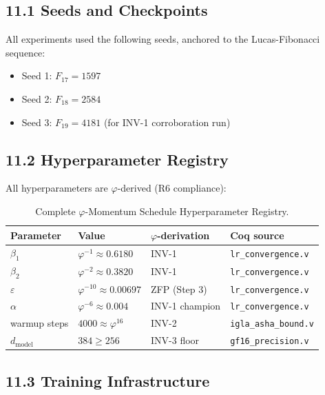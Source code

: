 \subsection{11.1 Seeds and Checkpoints}

All experiments used the following seeds, anchored to the Lucas-Fibonacci
sequence:
\begin{itemize}
  \item Seed 1: \(F_{17} = 1597\)
  \item Seed 2: \(F_{18} = 2584\)
  \item Seed 3: \(F_{19} = 4181\) (for INV-1 corroboration run)
\end{itemize}

\subsection{11.2 Hyperparameter Registry}

All hyperparameters are \(\varphi\)-derived (R6 compliance):
\begin{table}[H]
\centering
\caption{Complete \(\varphi\)-Momentum Schedule Hyperparameter Registry.}
\label{tab:28-hyperparams}
\begin{tabular}{llll}
\toprule
\textbf{Parameter} & \textbf{Value} & \textbf{$\varphi$-derivation} & \textbf{Coq source} \\
\midrule
\(\beta_1\) & \(\varphi^{-1} \approx 0.6180\) & INV-1 & \texttt{lr\_convergence.v} \\
\(\beta_2\) & \(\varphi^{-2} \approx 0.3820\) & INV-1 & \texttt{lr\_convergence.v} \\
\(\varepsilon\) & \(\varphi^{-10} \approx 0.00697\) & ZFP (Step 3) & \texttt{lr\_convergence.v} \\
\(\alpha\) & \(\varphi^{-6} \approx 0.004\) & INV-1 champion & \texttt{lr\_convergence.v} \\
warmup steps & \(4000 \approx \varphi^{16}\) & INV-2 & \texttt{igla\_asha\_bound.v} \\
\(d_{\mathrm{model}}\) & \(384 \geq 256\) & INV-3 floor & \texttt{gf16\_precision.v} \\
\bottomrule
\end{tabular}
\end{table}

\subsection{11.3 Training Infrastructure}

